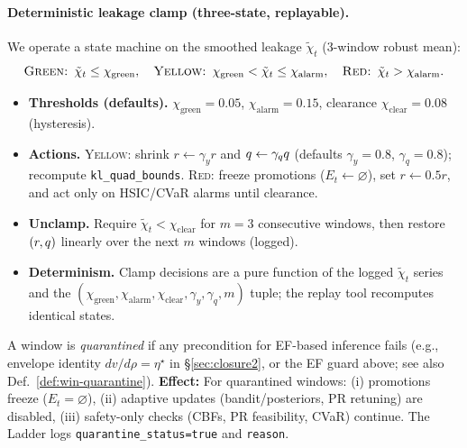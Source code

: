 \paragraph{Deterministic leakage clamp (three-state, replayable).}
We operate a state machine on the smoothed leakage $\tilde\chi_t$ (3-window robust mean):
\[
\textsc{Green: } \tilde\chi_t\le \chi_{\mathrm{green}},\quad
\textsc{Yellow: } \chi_{\mathrm{green}}<\tilde\chi_t\le \chi_{\mathrm{alarm}},\quad
\textsc{Red: } \tilde\chi_t>\chi_{\mathrm{alarm}}.
\]
\begin{itemize}[leftmargin=*]
\item \textbf{Thresholds (defaults).} $\chi_{\mathrm{green}}{=}0.05$, $\chi_{\mathrm{alarm}}{=}0.15$, clearance $\chi_{\mathrm{clear}}{=}0.08$ (hysteresis).
\item \textbf{Actions.} \textsc{Yellow}: shrink $r\leftarrow \gamma_y r$ and $q\leftarrow \gamma_qq$ (defaults $\gamma_y{=}0.8$, $\gamma_q{=}0.8$); recompute \texttt{kl\_quad\_bounds}. \textsc{Red}: freeze promotions ($E_t\!\leftarrow\!\varnothing$), set $r\leftarrow 0.5r$, and act only on HSIC/CVaR alarms until clearance.
\item \textbf{Unclamp.} Require $\tilde\chi_t<\chi_{\mathrm{clear}}$ for $m{=}3$ consecutive windows, then restore $(r,q)$ linearly over the next $m$ windows (logged).
\item \textbf{Determinism.} Clamp decisions are a pure function of the logged $\tilde\chi_t$ series and the $(\chi_{\mathrm{green}},\chi_{\mathrm{alarm}},\chi_{\mathrm{clear}},\gamma_y,\gamma_q,m)$ tuple; the replay tool recomputes identical states.
\end{itemize}

\begin{definition}\label{def:win-quarantine-entropy}
\emph{}
A window is \emph{quarantined} if any precondition for EF-based inference fails (e.g., envelope identity $dv/d\rho=\eta^\star$ in \S\ref{sec:closure2}, or the EF guard above; see also Def.~\ref{def:win-quarantine}).
\textbf{Effect:} For quarantined windows: (i) promotions freeze ($E_t\!=\!\varnothing$), (ii) adaptive updates (bandit/posteriors, PR retuning) are disabled, (iii) safety-only checks (CBFs, PR feasibility, CVaR) continue. The Ladder logs \texttt{quarantine\_status=true} and \texttt{reason}.
\end{definition}

